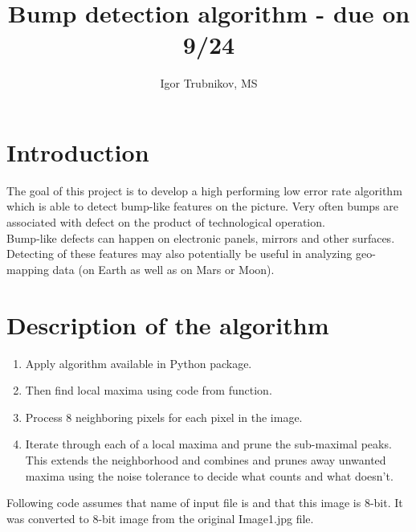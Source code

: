 \documentclass[letterpaper]{article}
\title{Bump detection algorithm - due on 9/24}
\author{Igor Trubnikov, MS}
\begin{document}
\maketitle
\tableofcontents
\newpage

\section{Introduction}
The goal of this project is to develop a high performing low error rate algorithm which is able to detect bump-like features on the picture. Very often bumps are associated with defect on the product of technological operation.\\
Bump-like defects can happen on electronic panels, mirrors and other surfaces.\\
Detecting of these features may also potentially be useful in analyzing geo-mapping data (on Earth as well as on Mars or Moon).\\

\newpage

\section{Description of the algorithm}

\begin{enumerate}
	\item Apply  algorithm available in Python  package.
	\item Then find local maxima using code from  function.
	\item Process 8 neighboring pixels for each pixel in the image.
	\item Iterate through each of a local maxima and prune the sub-maximal peaks.\\
	This extends the neighborhood and combines and prunes away unwanted maxima using the noise tolerance to decide what counts and what doesn't.
\end{enumerate}

Following code assumes that name of input file is  and that this image is 8-bit. It was converted to 8-bit image from the original Image1.jpg file.

\newpage
\end{document}
